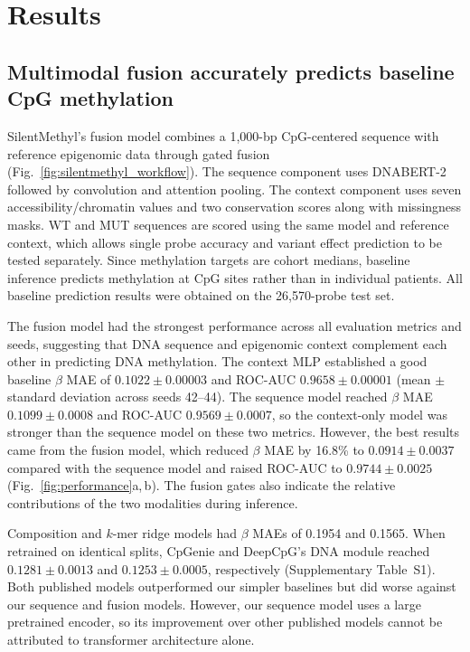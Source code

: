 \documentclass[11pt,letterpaper]{article}
\begin{document}
\section{Results}
\subsection{Multimodal fusion accurately predicts baseline CpG methylation}
\label{sec:performance}
SilentMethyl's fusion model combines a 1,000-bp CpG-centered sequence with reference epigenomic data through gated fusion (Fig.~\ref{fig:silentmethyl_workflow}). The sequence component uses DNABERT-2 followed by convolution and attention pooling. The context component uses seven accessibility/chromatin values and two conservation scores along with missingness masks. WT and MUT sequences are scored using the same model and reference context, which allows single probe accuracy and variant effect prediction to be tested separately. Since methylation targets are cohort medians, baseline inference predicts methylation at CpG sites rather than in individual patients. All baseline prediction results were obtained on the 26,570-probe test set. 

The fusion model had the strongest performance across all evaluation metrics and seeds, suggesting that DNA sequence and epigenomic context complement each other in predicting DNA methylation. The context MLP established a good baseline $\beta$ MAE of $0.1022 \pm 0.00003$ and ROC-AUC $0.9658 \pm 0.00001$ (mean $\pm$ standard deviation across seeds 42--44). The sequence model reached $\beta$ MAE $0.1099 \pm 0.0008$ and ROC-AUC $0.9569 \pm  0.0007$, so the context-only model was stronger than the sequence model on these two metrics. However, the best results came from the fusion model, which reduced $\beta$ MAE by 16.8\% to $0.0914 \pm 0.0037$ compared with the sequence model and raised ROC-AUC to $0.9744 \pm  0.0025$ (Fig.~\ref{fig:performance}a,\,b). The fusion gates also indicate the relative contributions of the two modalities during inference. 

Composition and $k$-mer ridge models had $\beta$ MAEs of 0.1954 and 0.1565. When retrained on identical splits, CpGenie and DeepCpG's DNA module reached $0.1281 \pm 0.0013$ and $0.1253 \pm 0.0005$, respectively (Supplementary Table~S1). Both published models outperformed our simpler baselines but did worse against our sequence and fusion models. However, our sequence model uses a large pretrained encoder, so its improvement over other published models cannot be attributed to transformer architecture alone.
\end{document}
